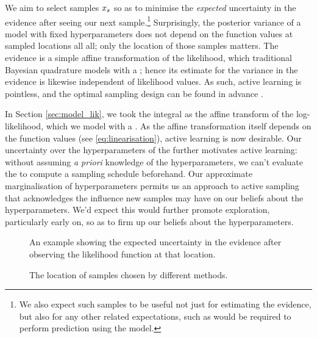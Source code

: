 \documentclass{article}
\begin{document}
We aim to select samples $\lfv_s$ so as to minimise the \textit{expected} uncertainty in the evidence after seeing our next sample.\footnote{We also expect such samples to be useful not just for estimating the evidence, but also for any other related expectations, such as would be required to perform prediction using the model.}
Surprisingly, the posterior variance of a \gpb model with fixed hyperparameters does not depend on the function values at sampled locations all all; only the location of those samples matters. The evidence is a simple affine transformation of the likelihood, which traditional Bayesian quadrature models with a \gp; hence its estimate for the variance in the evidence is likewise independent of likelihood values. As such, active learning is pointless, and the optimal sampling design can be found in advance \cite{minka2000dqr}.

In Section \ref{sec:model_lik}, we took the integral as the affine transform of the log-likelihood, which we model with a \gpb. As the affine transformation itself depends on the function values (see \eqref{eq:linearisation}), active learning is now desirable. Our uncertainty over the hyperparameters of the \gpb further motivates active learning: without assuming \textit{a priori} knowledge of the hyperparameters, we can't evaluate the \gpb to compute a sampling schedule beforehand. Our approximate marginalisation of hyperparameters permits us an approach to active sampling that acknowledges the influence new samples may have on our beliefs about the hyperparameters. We'd expect this would further promote exploration, particularly early on, so as to firm up our beliefs about the hyperparameters. 

 \begin{figure}
 \centering
{}
 \caption{An example showing the expected uncertainty in the evidence after observing the likelihood function at that location.}
 \label{fig:eue}
 \end{figure}
 

\begin{figure}
\centering
{}
\caption{The location of samples chosen by different methods.}
\label{fig:sample_paths}
\end{figure}
\end{document}
